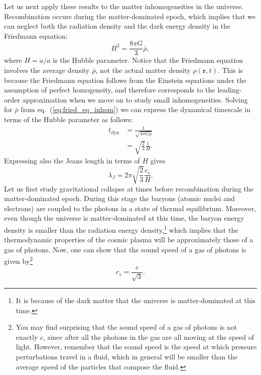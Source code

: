 \documentclass[11pt, a4paper,oneside,openright]{book}
\numberwithin{equation}{section}
\begin{document}
Let us next apply these results to the matter inhomogeneities in the universe. Recombination occurs during the matter-dominated epoch, which implies that we can neglect both the radiation density and the dark energy density in the Friedmann equation:
\begin{equation} \label{eq:fried_eq_inhom}
H^2=\frac{8\pi G}{3}\bar{\rho},
\end{equation}
where $H=\dot{a}/a$ is the Hubble parameter. Notice that the Friedmann equation involves the average density $\bar{\rho}$, not the actual matter density $\rho(\mathbf{r},t)$. This is because the Friedmann equation follows from the Einstein equations under the assumption of perfect homogeneity, and therefore corresponds to the leading-order approximation when we move on to study small inhomogeneities. Solving for $\bar{\rho}$ from eq.\ (\ref{eq:fried_eq_inhom}) we can express the dynamical timescale in terms of the Hubble parameter as follows:
\begin{equation}
\begin{split}
t_{\mathrm{dyn}}&=\frac{1}{\sqrt{4\pi G\bar{\rho}}}\\
&=\sqrt{\frac{2}{3}}\frac{1}{H}.
\end{split}
\end{equation}
Expressing also the Jeans length in terms of $H$ gives
\begin{equation} \label{eq:jeans_hubble}
\lambda_J=2\pi\sqrt{\frac{2}{3}}\frac{c_s}{H}.
\end{equation}
Let us first study gravitational collapse at times before recombination during the matter-dominated epoch. During this stage the baryons (atomic nuclei and electrons) are coupled to the photons in a state of thermal equilibrium. Moreover, even though the universe is matter-dominated at this time, the baryon energy density is smaller than the radiation energy density,\footnote{It is because of the dark matter that the universe is matter-dominated at this time.} which implies that the thermodynamic properties of the cosmic plasma will be approximately those of a gas of photons. Now, one can show that the sound speed of a gas of photons is given by\footnote{You may find surprising that the sound speed of a gas of photons is not exactly $c$, since after all the photons in the gas are all moving at the speed of light. However, remember that the sound speed is the speed at which pressure perturbations travel in a fluid, which in general will be smaller than the average speed of the particles that compose the fluid.
}
\begin{equation}
c_s=\frac{c}{\sqrt{3}}.
\end{equation}
\end{document}
